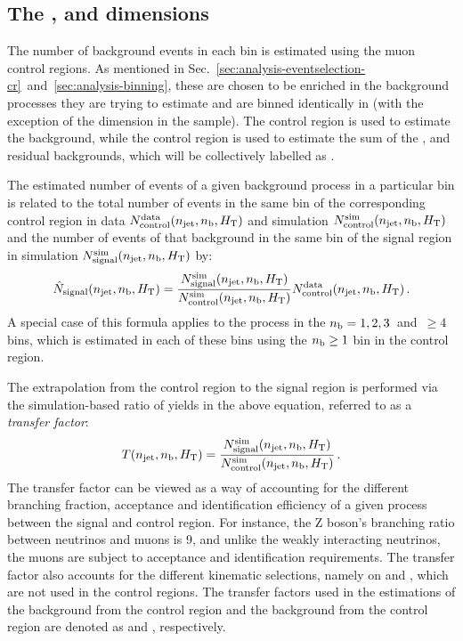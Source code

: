 \subsection{The \njet, \nb and \scalht dimensions}
\label{sec:analysis-estimation-njnbht}
The number of background events in each \njnbht bin is estimated using the muon 
control regions. As mentioned in 
Sec.~\ref{sec:analysis-eventselection-cr}~and~\ref{sec:analysis-binning}, these 
are chosen to be enriched in the background processes they are trying to 
estimate and are binned identically in \njnbht (with the exception of the \nb 
dimension in the \mmj sample). The \mmj control region is used to estimate the 
\znnj background, while the \mj control region is used to estimate the sum of 
the \wlj, \ttbar and residual backgrounds, which will be collectively labelled 
as \ttw.

The estimated number of events of a given background process in a particular 
\njnbht bin is related to the total number of events in the same bin of the 
corresponding control region in data $N_\mathrm{control}^\mathrm{data}(n_{\text{jet}}, n_{\text{b}}, \mbox{$H_\text{T}$})$ 
and simulation $N_\mathrm{control}^\mathrm{sim}(n_{\text{jet}}, n_{\text{b}}, \mbox{$H_\text{T}$})$ and the number of 
events of that background in the same bin of the signal region in simulation 
$N_\mathrm{signal}^\mathrm{sim}(n_{\text{jet}}, n_{\text{b}}, \mbox{$H_\text{T}$})$ by:
\begin{equation}
\label{eqn:estimation}
\hat{N}_\mathrm{signal}(n_{\text{jet}}, n_{\text{b}}, \mbox{$H_\text{T}$}) = 
\frac{N_\mathrm{signal}^\mathrm{sim}(n_{\text{jet}}, n_{\text{b}}, \mbox{$H_\text{T}$})}{N_\mathrm{control}^\mathrm{sim}(n_{\text{jet}}, n_{\text{b}}, \mbox{$H_\text{T}$})}
 N_\mathrm{control}^\mathrm{data}(n_{\text{jet}}, n_{\text{b}}, \mbox{$H_\text{T}$}) \, .
\end{equation}
A special case of this formula applies to the \znnj process in the $n_{\text{b}}=1, 2, 
3$~and~$\ge4$ bins, which is estimated in each of these bins using the $n_{\text{b}} \ge 
1$ bin in the \mmj control region.

The extrapolation from the control region to the signal region is performed via 
the simulation-based ratio of yields in the above equation, referred to as a 
\textit{transfer factor}:
\begin{equation}
T(n_{\text{jet}}, n_{\text{b}}, \mbox{$H_\text{T}$})  = 
\frac{N_\mathrm{signal}^\mathrm{sim}(n_{\text{jet}}, n_{\text{b}}, \mbox{$H_\text{T}$})}{N_\mathrm{control}^\mathrm{sim}(n_{\text{jet}}, n_{\text{b}}, \mbox{$H_\text{T}$})}
 \, .
\end{equation}
The transfer factor can be viewed as a way of accounting for the different 
branching fraction, acceptance and identification efficiency of a given process 
between the signal and control region. For instance, the Z boson's branching 
ratio between neutrinos and muons is 9, and unlike the weakly interacting 
neutrinos, the muons are subject to acceptance and identification requirements. 
The transfer factor also accounts for the different kinematic selections, 
namely on \alphat and \bdphi, which are not used in the control regions. 
The transfer factors used in the estimations of the \ttw background from the 
\mj control region and the \znnj background from the \mmj control region are 
denoted as \Tmutottw and \Tmumutoz, respectively.

